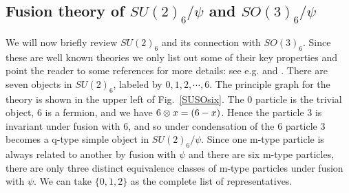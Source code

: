 \subsection{Fusion theory of $SU(2)_6/\psi$ and $SO(3)_6/\psi$}

We will now briefly review $SU(2)_6$ and its connection with $SO(3)_6$.
Since these are well known theories we only list out some of their key properties and point the 
reader to some references for more details: see e.g. \cite{kirillow1989} and \cite{Bonderson2007}.
There are seven objects in $SU(2)_6$, labeled by $0,1,2,\cdots, 6$.
The principle graph for the theory is shown in the upper left of Fig.~\ref{SUSOsix}. 
The $0$ particle is the trivial object, $6$ is a fermion, and we have $6 \otimes x = (6-x)$. 
Hence the particle $3$ is invariant under fusion with $6$, and so under condensation of the $6$ 
particle $3$ becomes a q-type simple object in $SU(2)_6/\psi$.
Since one m-type particle is always related to another by fusion with $\psi$ and 
there are six m-type particles, there are only three distinct equivalence classes of m-type
particles under fusion with $\psi$. 
We can take $\{0,1,2\}$ as the complete list of representatives.

